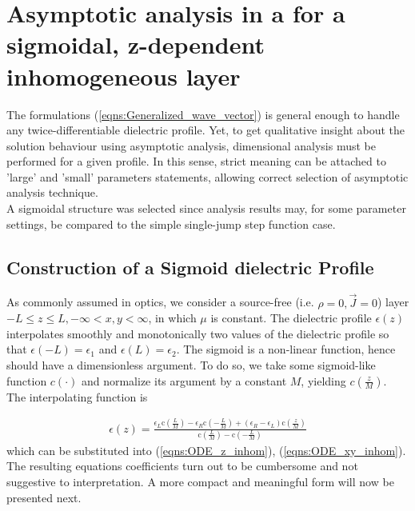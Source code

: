 \documentclass[twocolumn,secnumarabic,amssymb, nobibnotes, aps, prd]{revtex4-1}
\begin{document}
   
  


\section{Asymptotic analysis in a for a sigmoidal, z-dependent inhomogeneous layer} 
The formulations (\ref{eqns:Generalized_wave_vector}) is general enough to handle any twice-differentiable dielectric profile. Yet,  to get qualitative insight about the solution behaviour using asymptotic analysis, dimensional analysis must be performed for a given profile. In this sense, strict meaning can be attached to 'large' and 'small' parameters statements, allowing correct selection of asymptotic analysis technique.  \\
A sigmoidal structure was selected since analysis results may, for some parameter settings, be compared to the simple single-jump step function case. 
\subsection{Construction of a Sigmoid dielectric Profile}
\label{sec:sigmoid_profile}
As commonly assumed in optics, we consider a source-free (i.e. $\rho=0, \overrightarrow{J}=0$) layer $-L \leq z \leq L, -\infty < x,y < \infty$, in  which $\mu$ is constant. The dielectric profile $\epsilon(z)$ interpolates smoothly and monotonically two values of the dielectric profile so that $\epsilon(-L)=\epsilon_1$ and $\epsilon(L)=\epsilon_2$. The sigmoid is a non-linear function, hence should have a dimensionless argument. To do so, we take some sigmoid-like function $c( \cdot )$ and normalize its argument  by  a constant $M$, yielding $c\left( \frac{z}{M}\right)$. The interpolating function is


\begin{align}
\epsilon(z) = \frac{\epsilon_L \text{c}\left(\frac{L}{M}\right)-\epsilon_R \text{c}\left(-\frac{L}{M}\right)+(\epsilon_R-\epsilon_L)
   \text{c}\left(\frac{z}{M}\right)}{\text{c}\left(\frac{L}{M}\right)-\text{c}\left(-\frac{L}{M}\right)
   }
\label{eqns:eps_z_dim_profile}
\end{align}
which can be substituted into (\ref{eqns:ODE_z_inhom}), (\ref{eqns:ODE_xy_inhom}). The resulting equations coefficients turn out to be cumbersome and not suggestive to interpretation. A more compact and meaningful form will now be presented next.

  
\end{document}
